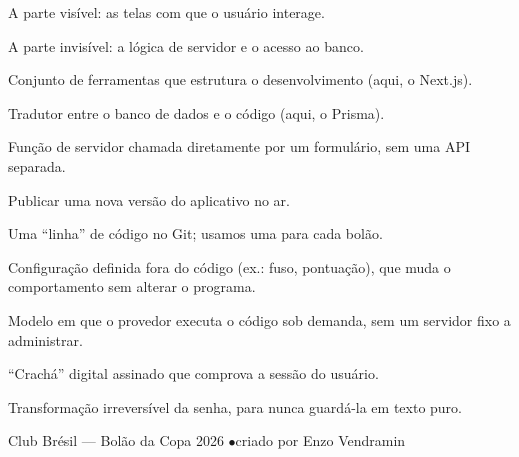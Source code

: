 \documentclass[11pt,a4paper]{article}
\begin{document}
\begin{description}[leftmargin=0pt,style=nextline]
  \item[Frontend] A parte visível: as telas com que o usuário interage.
  \item[Backend] A parte invisível: a lógica de servidor e o acesso ao banco.
  \item[Framework] Conjunto de ferramentas que estrutura o desenvolvimento
  (aqui, o Next.js).
  \item[ORM] Tradutor entre o banco de dados e o código (aqui, o Prisma).
  \item[Server Action] Função de servidor chamada diretamente por um
  formulário, sem uma API separada.
  \item[Deploy] Publicar uma nova versão do aplicativo no ar.
  \item[Branch] Uma ``linha'' de código no Git; usamos uma para cada bolão.
  \item[Variável de ambiente] Configuração definida fora do código (ex.: fuso,
  pontuação), que muda o comportamento sem alterar o programa.
  \item[Serverless] Modelo em que o provedor executa o código sob demanda, sem
  um servidor fixo a administrar.
  \item[JWT] ``Crachá'' digital assinado que comprova a sessão do usuário.
  \item[Hash (bcrypt)] Transformação irreversível da senha, para nunca
  guardá-la em texto puro.
\end{description}

\vfill
\begin{center}
\color{cinza}\small
Club Brésil --- Bolão da Copa 2026 \quad$\bullet$\quad criado por Enzo Vendramin
\end{center}
\end{document}
